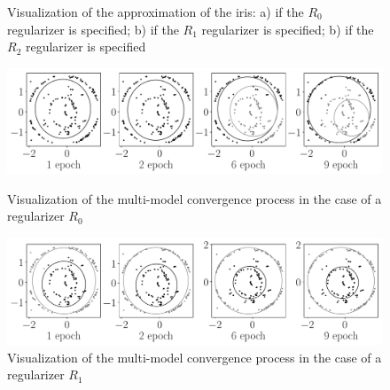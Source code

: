\begin{figure}[h!]
\caption{Visualization of the approximation of the iris: a) if the $ R_0 $ regularizer is specified; b) if the $ R_1 $ regularizer is specified; b) if the $ R_2 $ regularizer is specified}
\label{ce:fig6}
\end{figure}


\begin{figure}
     \includegraphics[width=\textwidth]{results/priorexpertfig/experiment_real_not_prior}\\
     \caption{Visualization of the multi-model convergence process in the case of a regularizer $R_0$}
    \label{ce:fig7}
\end{figure}

\begin{figure}
     \includegraphics[width=\textwidth]{results/priorexpertfig/experiment_real_prior}
     \caption{Visualization of the multi-model convergence process in the case of a regularizer $R_1$}
    \label{ce:fig8}
\end{figure}

